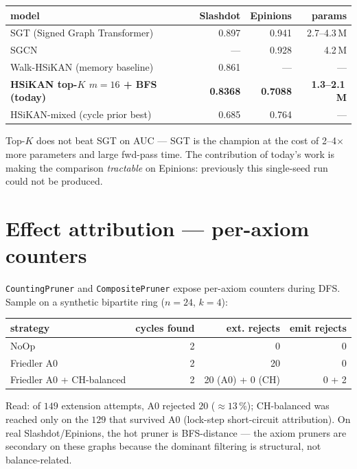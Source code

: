 \documentclass[11pt,a4paper]{article}
\newcommand{\code}[1]{\texttt{\small #1}}
\begin{document}
\begin{center}
\begin{tabular}{lrrr}
\toprule
model                                  & Slashdot & Epinions & params \\
\midrule
SGT (Signed Graph Transformer)         & 0.897    & 0.941    & 2.7--4.3\,M \\
SGCN                                   & ---      & 0.928    & 4.2\,M       \\
Walk-HSiKAN (memory baseline)          & 0.861    & ---      & ---          \\
\textbf{HSiKAN top-$K$ $m{=}16$ + BFS (today)} & \textbf{0.8368} & \textbf{0.7088} & \textbf{1.3--2.1\,M} \\
HSiKAN-mixed (cycle prior best)        & 0.685    & 0.764    & ---          \\
\bottomrule
\end{tabular}
\end{center}

Top-$K$ does not beat SGT on AUC --- SGT is the champion at the cost
of 2--4$\times$ more parameters and large fwd-pass time. The
contribution of today's work is making the comparison
\emph{tractable} on Epinions: previously this single-seed run could
not be produced.

\section{Effect attribution --- per-axiom counters}

\code{CountingPruner} and \code{CompositePruner} expose per-axiom
counters during DFS. Sample on a synthetic bipartite ring
($n{=}24$, $k{=}4$):

\begin{center}
\begin{tabular}{lrrr}
\toprule
strategy                    & cycles found & ext. rejects & emit rejects \\
\midrule
NoOp                        & 2  & 0  & 0 \\
Friedler A0                 & 2  & 20 & 0 \\
Friedler A0 + CH-balanced   & 2  & 20 (A0) + 0 (CH) & 0 + 2 \\
\bottomrule
\end{tabular}
\end{center}

Read: of $149$ extension attempts, A0 rejected $20$
($\approx 13\,\%$); CH-balanced was reached only on the $129$ that
survived A0 (lock-step short-circuit attribution). On real
Slashdot/Epinions, the hot pruner is BFS-distance --- the axiom
pruners are secondary on these graphs because the dominant
filtering is structural, not balance-related.
\end{document}
